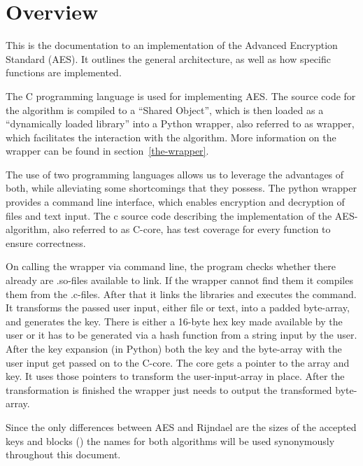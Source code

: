 \hypertarget{overview}{%
\chapter{Overview}\label{overview}}

This is the documentation to an implementation of the Advanced Encryption Standard (AES). It outlines the general architecture, as well as how specific functions are implemented.

The C programming language is used for implementing
AES. The source code for the algorithm is compiled to a ``Shared
Object'', which is then loaded as a ``dynamically loaded library'' into
a Python wrapper, also referred to as wrapper, which facilitates the
interaction with the algorithm. More information on the wrapper can be found in section~\ref{the-wrapper}.

The use of two programming languages allows us to leverage the advantages
of both, while alleviating some shortcomings that they possess. The
python wrapper provides a command line interface, which enables
encryption and decryption of files and text input. The c source code
describing the implementation of the AES-algorithm, also referred to as
C-core, has test coverage for every function to ensure correctness.

On calling the wrapper via command line, the program checks
whether there already are .so-files available to link. If the wrapper
cannot find them it compiles them from the .c-files. After that it links
the libraries and executes the command. It transforms the passed user
input, either file or text, into a padded byte-array, and generates the
key. There is either a 16-byte hex key made available by the user or it
has to be generated via a hash function from a string input by the user.
After the key expansion (in Python) both the key and the byte-array with
the user input get passed on to the C-core. The core gets a pointer to
the array and key. It uses those pointers to transform the
user-input-array in place. After the transformation is finished the
wrapper just needs to output the transformed byte-array.

Since the only differences between AES and Rijndael are the sizes of the
accepted keys and blocks (\cite[p. 31]{rijndael}) the names for both algorithms
will be used synonymously throughout this document.
